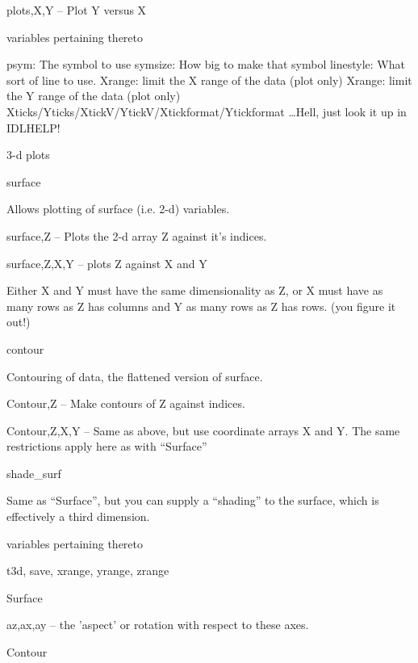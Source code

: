 \documentclass{article}
\begin{document}
	    plots,X,Y -- Plot Y versus X

	  \item variables pertaining thereto

	     psym: The symbol to use
             symsize: How big to make that symbol
             linestyle: What sort of line to use.
             Xrange: limit the X range of the data (plot only)
             Xrange: limit the Y range of the data (plot only)
	     Xticks/Yticks/XtickV/YtickV/Xtickformat/Ytickformat
            \ldots Hell, just look it up in IDLHELP!


	\ei
    \item 3-d plots
       \bi

         \item surface

	   Allows plotting of surface (i.e. 2-d) variables.

	   surface,Z -- Plots the 2-d array Z against it's indices.

	   surface,Z,X,Y -- plots Z against X and Y
	  
	     Either X and Y must have the same dimensionality as Z, or
            X must have as many rows as Z has columns and Y as many
            rows as Z has rows. (you figure it out!)

         \item contour

           Contouring of data, the flattened version of surface.

	   Contour,Z -- Make contours of Z against indices.
          
           Contour,Z,X,Y  -- Same as above, but use coordinate arrays
            X and Y. The same restrictions apply here as with ``Surface''

         \item shade\_surf 

	   Same as ``Surface'', but you can supply a ``shading'' to
            the surface, which is effectively a third dimension.

	  \item variables pertaining thereto

	   t3d, save, xrange, yrange, zrange

 	   \bi
	     \item Surface
	        
	       az,ax,ay -- the 'aspect' or rotation with respect to
               these axes.
	
	       
	     \item Contour
\end{document}
